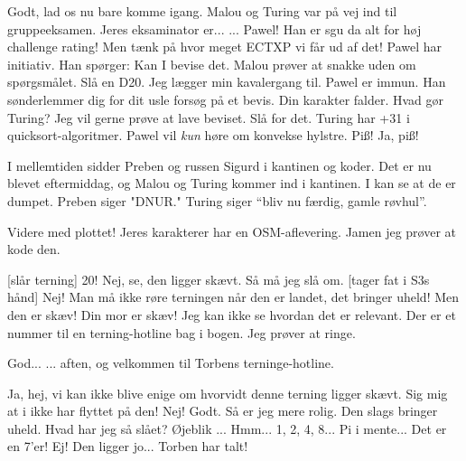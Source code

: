 \documentclass[a4paper,11pt]{article}
\begin{document}
\begin{sketch}
 Godt, lad os nu bare komme igang. Malou og Turing var på vej ind til gruppeeksamen.
    Jeres eksaminator er... ...  Pawel!
 Han er sgu da alt for høj challenge rating!
 Men tænk på hvor meget ECTXP vi får ud af det!
 Pawel har initiativ. Han spørger: Kan I bevise det.
 Malou prøver at snakke uden om spørgsmålet.
 Slå en D20.
 Jeg lægger min kavalergang til.
 Pawel er immun. Han sønderlemmer dig for dit usle forsøg på et bevis. Din karakter falder. Hvad gør Turing?
 Jeg vil gerne prøve at lave beviset.
 Slå for det.
 Turing har +31 i quicksort-algoritmer.
 Pawel vil \textit{kun} høre om konvekse hylstre.
 Piß!
 Ja, piß!

 I mellemtiden sidder Preben og russen Sigurd i kantinen og
koder.  Det er nu blevet eftermiddag, og Malou og Turing kommer ind i
kantinen. I kan se at de er dumpet.
 Preben siger "DNUR."
 Turing siger "`bliv nu færdig, gamle røvhul"'.

 Videre med plottet!  Jeres karakterer har en OSM-aflevering.
 Jamen jeg prøver at kode den.


[slår terning] 20!
 Nej, se, den ligger skævt.
 Så må jeg slå om.
[tager fat i S3s hånd] Nej! Man må ikke røre terningen når den er landet, det bringer uheld!
 Men den er skæv!
 Din mor er skæv!
 Jeg kan ikke se hvordan det er relevant.
 Der er et nummer til en terning-hotline bag i bogen.
 Jeg prøver at ringe.


 God...
 ... aften, og velkommen til Torbens terninge-hotline.

 Ja, hej, vi kan ikke blive enige om hvorvidt denne terning ligger skævt.
 Sig mig at i ikke har flyttet på den!
 Nej!
 Godt. Så er jeg mere rolig. Den slags bringer uheld.
 Hvad har jeg så slået?
 Øjeblik ... Hmm... 1, 2, 4, 8... Pi i mente... Det er en 7'er!
 Ej! Den ligger jo...
 Torben har talt!


\end{sketch}
\end{document}
